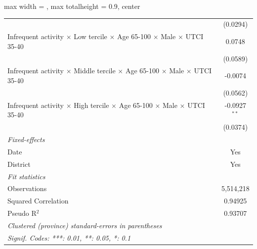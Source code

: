 \begin{table}[htbp]
\begin{adjustbox}{max width = \textwidth, max totalheight = 0.9\textheight, center}
\begin{tabular}{lc}
                                                                                                                 & (0.0294)\\   
         Infrequent activity $\times$ Low tercile $\times$ Age 65-100 $\times$ Male $\times$ UTCI 35-40          & 0.0748\\   
                                                                                                                 & (0.0589)\\   
         Infrequent activity $\times$ Middle tercile $\times$ Age 65-100 $\times$ Male $\times$ UTCI 35-40       & -0.0074\\   
                                                                                                                 & (0.0562)\\   
         Infrequent activity $\times$ High tercile $\times$ Age 65-100 $\times$ Male $\times$ UTCI 35-40         & -0.0927$^{**}$\\   
                                                                                                                 & (0.0374)\\   
         \midrule
         \emph{Fixed-effects}\\
         Date                                                                                                    & Yes\\  
         District                                                                                                & Yes\\  
         \midrule
         \emph{Fit statistics}\\
         Observations                                                                                            & 5,514,218\\  
         Squared Correlation                                                                                     & 0.94925\\  
         Pseudo R$^2$                                                                                            & 0.93707\\  
         \midrule \midrule
         \multicolumn{2}{l}{\emph{Clustered (province) standard-errors in parentheses}}\\
         \multicolumn{2}{l}{\emph{Signif. Codes: ***: 0.01, **: 0.05, *: 0.1}}\\
      \end{tabular}
   \end{adjustbox}
\end{table}


